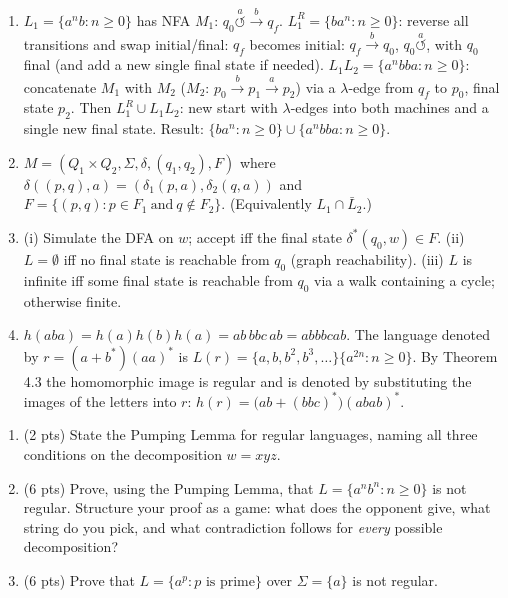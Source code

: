 \documentclass[11pt,a4paper]{article}
\newcounter{prob}
\newenvironment{problem}[1][]{%
  \refstepcounter{prob}%
  \begin{tcolorbox}[enhanced,breakable,colback=white,colframe=SteelBlue!70!black,
      boxrule=0.8pt,arc=1.5mm,left=5pt,right=5pt,top=3pt,bottom=3pt,
      before skip=8pt,after skip=8pt,
      title={\textbf{Question \theprob\ (#1)}},fonttitle=\bfseries, coltitle=white,
      colbacktitle=SteelBlue!70!black, boxed title style={arc=1mm}]}
{\end{tcolorbox}}
\newenvironment{solution}{%
  \begin{tcolorbox}[enhanced,breakable,colback=Honeydew!55,colframe=ForestGreen!60!black,
      boxrule=0.6pt,arc=1.5mm,left=5pt,right=5pt,top=3pt,bottom=3pt,
      before skip=6pt,after skip=10pt,
      title={\textbf{Solution \theprob}},fonttitle=\bfseries, coltitle=white,
      colbacktitle=ForestGreen!60!black, boxed title style={arc=1mm}]}
{\end{tcolorbox}}
\begin{document}
\begin{solution}
\begin{enumerate}[label=(\alph*)]
  \item $L_1=\{a^nb:n\ge0\}$ has NFA $M_1$: $q_0\overset{a}{\circlearrowleft}\overset{b}{\to}q_f$.
  $L_1^R=\{ba^n:n\ge0\}$: reverse all transitions and swap
  initial/final: $q_f$ becomes initial: $q_f\overset{b}{\to}q_0$,
  $q_0\overset{a}{\circlearrowleft}$, with $q_0$ final (and add a new
  single final state if needed). $L_1L_2=\{a^nbba:n\ge0\}$:
  concatenate $M_1$ with $M_2$ ($M_2$: $p_0\overset{b}{\to}p_1\overset{a}{\to}p_2$)
  via a $\lambda$-edge from $q_f$ to $p_0$, final state $p_2$. Then
  $L_1^R\cup L_1L_2$: new start with $\lambda$-edges into both
  machines and a single new final state. Result:
  $\{ba^n:n\ge0\}\cup\{a^nbba:n\ge0\}$.
  \item $M=(Q_1\times Q_2,\Sigma,\delta,(q_1,q_2),F)$ where
  $\delta((p,q),a)=(\delta_1(p,a),\delta_2(q,a))$ and
  $F=\{(p,q):p\in F_1\ \text{and}\ q\notin F_2\}$. (Equivalently
  $L_1\cap\bar L_2$.)
  \item (i) Simulate the DFA on $w$; accept iff the final state
  $\delta^*(q_0,w)\in F$. (ii) $L=\emptyset$ iff no final state is
  reachable from $q_0$ (graph reachability). (iii) $L$ is infinite
  iff some final state is reachable from $q_0$ via a walk containing
  a cycle; otherwise finite.
  \item $h(aba)=h(a)h(b)h(a)=ab\,bbc\,ab=abbbcab$.
  The language denoted by $r=(a+b^*)(aa)^*$ is
  $L(r)=\{a,b,b^2,b^3,\ldots\}\{a^{2n}:n\ge0\}$. By Theorem 4.3 the
  homomorphic image is regular and is denoted by substituting the
  images of the letters into $r$:
  $h(r)=\big(ab+(bbc)^*\big)(abab)^*$.
\end{enumerate}
\end{solution}

\begin{problem}[Pumping Lemma -- 14 points]
\begin{enumerate}[label=(\alph*)]
  \item (2 pts) State the Pumping Lemma for regular languages, naming all three conditions on the decomposition $w=xyz$.
  \item (6 pts) Prove, using the Pumping Lemma, that
  $L=\{a^nb^n:n\ge0\}$ is not regular. Structure your proof as a game: what does the opponent give, what string do you pick, and what contradiction follows for \emph{every} possible decomposition?
  \item (6 pts) Prove that $L=\{a^p:p\text{ is prime}\}$ over $\Sigma=\{a\}$ is not regular.
\end{enumerate}
\end{problem}
\end{document}
